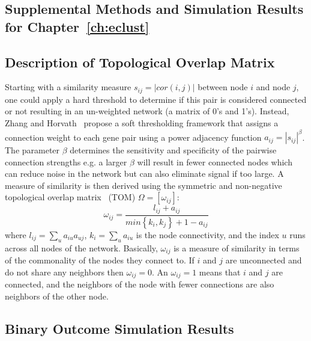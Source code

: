 \begin{appendices}
	
\chapter{Supplemental Methods and Simulation Results for Chapter~\ref{ch:eclust}} \label{ap:eclust}
\captionsetup{list=no}
\section{Description of Topological Overlap Matrix} \label{ap:tomdefinition}

Starting with a similarity measure $s_{ij}=|cor(i,j)|$ between node $i$ and node $j$, one could apply a hard threshold to determine if this pair is considered connected or not resulting in an un-weighted network (a matrix of 0's and 1's). Instead, Zhang and Horvath~\citep{zhang2005general} propose a soft thresholding framework that assigns a connection weight to each gene pair using a power adjacency function $a_{ij} = |s_{ij}|^{\beta}$. The parameter $\beta$ determines the sensitivity and specificity of the pairwise connection strengths e.g. a larger $\beta$ will result in fewer connected nodes which can reduce noise in the network but can also eliminate signal if too large. A measure of similarity is then derived using the symmetric and non-negative topological overlap matrix~\citep{ravasz2002hierarchical} (TOM) $\Omega = [\omega_{ij}]$:
\begin{equation}
\omega_{ij} = \frac{l_{ij} + a_{ij}}{min\left\lbrace k_i, k_j \right\rbrace + 1-a_{ij} }  \label{eq:TOM}
\end{equation}
where $l_{ij} = \sum_u a_{iu}a_{uj}$, $k_i = \sum_u a_{iu}$ is the node connectivity, and the index $u$ runs across all nodes of the network. Basically, $\omega_{ij}$ is a measure of similarity in terms of the commonality of the nodes they connect to. If $i$ and $j$ are unconnected and do not share any neighbors then $\omega_{ij}=0$. An $\omega_{ij}=1$ means that $i$ and $j$ are connected, and the neighbors of the node with fewer connections are also neighbors of the other node. 


\section{Binary Outcome Simulation Results}\label{ap:binaryoutcome}


\end{appendices}
